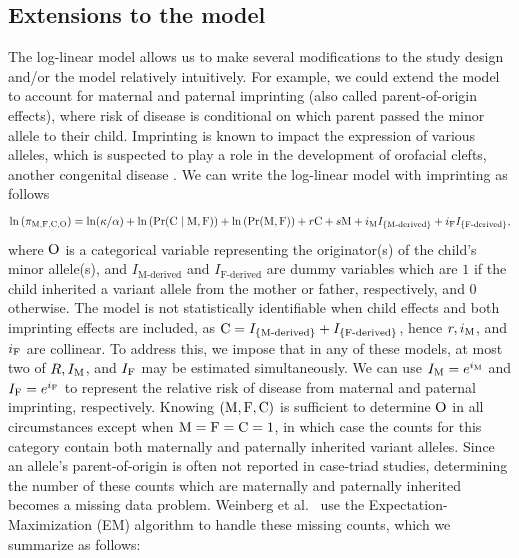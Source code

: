 \subsection{Extensions to the model}\label{sec:extensions}

The log-linear model allows us to make several modifications to the study design and/or the model relatively intuitively.
For example, we could extend the model to account for maternal and paternal imprinting (also called parent-of-origin effects), where risk of disease is conditional on which parent passed the minor allele to their child.
Imprinting is known to impact the expression of various alleles, which is suspected to play a role in the development of orofacial clefts, another congenital disease \cite{Garl+20, Rase+25}.
We can write the log-linear model with imprinting as follows
\begin{equation*}
    \ln\left(\pi_{{\rm M}, {\rm F}, {\rm C}, {\rm O}}\right) = \ln(\kappa/\alpha) + \ln\left(\Pr({\rm C} \mid {\rm M}, {\rm F})\right) + \ln\left(\Pr({\rm M}, {\rm F})\right) + r {\rm C} + s {\rm M} + i_{{\rm M}} I_{\text{\{M-derived\}}} + i_{{\rm F}} I_{\text{\{F-derived\}}},
\end{equation*}
where ${\rm O}$ is a categorical variable representing the originator(s) of the child's minor allele(s), and $I_{\text{M-derived}}$ and $I_{\text{F-derived}}$ are dummy variables which are $1$ if the child inherited a variant allele from the mother or father, respectively, and $0$ otherwise.
The model is not statistically identifiable when child effects and both imprinting effects are included, as ${\rm C} = I_{\text{\{M-derived\}}} + I_{\text{\{F-derived\}}}$, hence $r, i_{{\rm M}}$, and $i_{{\rm F}}$ are collinear.
To address this, we impose that in any of these models, at most two of $R, I_{{\rm M}}$, and $I_{{\rm F}}$ may be estimated simultaneously.
We can use $I_{{\rm M}} = e^{i_{{\rm M}}}$ and $I_{{\rm F}} = e^{i_{{\rm F}}}$ to represent the relative risk of disease from maternal and paternal imprinting, respectively.
Knowing $({\rm M}, {\rm F}, {\rm C})$ is sufficient to determine ${\rm O}$ in all circumstances except when ${\rm M} = {\rm F} = {\rm C} = 1$, in which case the counts for this category contain both maternally and paternally inherited variant alleles.
Since an allele's parent-of-origin is often not reported in case-triad studies, determining the number of these counts which are maternally and paternally inherited becomes a missing data problem.
Weinberg et al.~\cite{Wein+98} use the Expectation-Maximization (EM) algorithm to handle these missing counts, which we summarize as follows:
